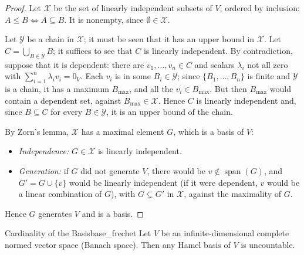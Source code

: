 \documentclass[11pt, a4paper]{article}
\begin{document}
\begin{proof}
Let $\mathcal{X}$ be the set of linearly independent subsets of $V$, ordered by inclusion: $A \le B \iff A \subseteq B$. It is nonempty, since $\emptyset \in \mathcal{X}$.

Let $\mathcal{Y}$ be a chain in $\mathcal{X}$; it must be seen that it has an upper bound in $\mathcal{X}$. Let $C = \bigcup_{B \in \mathcal{Y}} B$; it suffices to see that $C$ is linearly independent. By contradiction, suppose that it is dependent: there are $v_1, \dots, v_n \in C$ and scalars $\lambda_i$ not all zero with $\sum_{i=1}^n \lambda_i v_i = 0_V$. Each $v_i$ is in some $B_i \in \mathcal{Y}$; since $\{B_1, \dots, B_n\}$ is finite and $\mathcal{Y}$ is a chain, it has a maximum $B_{\max}$, and all the $v_i \in B_{\max}$. But then $B_{\max}$ would contain a dependent set, against $B_{\max} \in \mathcal{X}$. Hence $C$ is linearly independent and, since $B \subseteq C$ for every $B \in \mathcal{Y}$, it is an upper bound of the chain.

By Zorn's lemma, $\mathcal{X}$ has a maximal element $G$, which is a basis of $V$:
\begin{itemize}
    \item \textit{Independence:} $G \in \mathcal{X}$ is linearly independent.
    \item \textit{Generation:} if $G$ did not generate $V$, there would be $v \notin \operatorname{span}(G)$, and $G' = G \cup \{v\}$ would be linearly independent (if it were dependent, $v$ would be a linear combination of $G$), with $G \subsetneq G'$ in $\mathcal{X}$, against the maximality of $G$.
\end{itemize}
Hence $G$ generates $V$ and is a basis.
\end{proof}

\begin{teorema}{Cardinality of the Basis}{base_frechet}
Let $V$ be an infinite-dimensional complete normed vector space (Banach space).
Then any Hamel basis of $V$ is uncountable.
\end{teorema}
\end{document}
